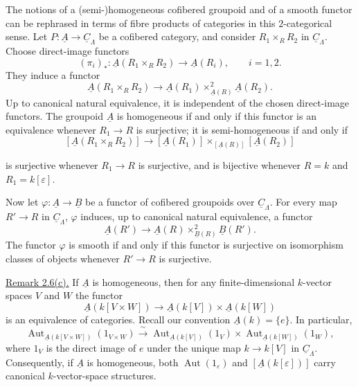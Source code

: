 The notions of a (semi-)homogeneous cofibered groupoid and of a
smooth functor can be rephrased in terms of fibre products of
categories in this $2$-categorical sense. Let
$P:\underline A\longrightarrow\underline C_\Lambda$ be a
cofibered category, and consider $R_1\times_RR_2$ in
$\underline C_\Lambda$. Choose direct-image functors
\[
 (\pi_i)_*:\underline A(R_1\times_RR_2)
 \longrightarrow\underline A(R_i),\qquad i=1,2.
\]
They induce a functor
\[
 \underline A(R_1\times_RR_2)\longrightarrow
 \underline A(R_1)\times^2_{\underline A(R)}\underline A(R_2).
\]
Up to canonical natural equivalence, it is independent of the
chosen direct-image functors. The groupoid $\underline A$ is
homogeneous if and only if this functor is an equivalence whenever
$R_1\longrightarrow R$ is surjective; it is semi-homogeneous if and
only if
\[
 [\underline A(R_1\times_RR_2)]\longrightarrow
 [\underline A(R_1)]
 \times_{[\underline A(R)]}[\underline A(R_2)]
\]


is surjective whenever $R_1\longrightarrow R$ is surjective, and is
bijective whenever $R=k$ and $R_1=k[\varepsilon]$.

Now let $\varphi:\underline A\longrightarrow\underline B$ be a
functor of cofibered groupoids over $\underline C_\Lambda$. For
every map $R'\longrightarrow R$ in $\underline C_\Lambda$,
$\varphi$ induces, up to canonical natural equivalence, a functor
\[
 \underline A(R')\longrightarrow
 \underline A(R)\times^2_{\underline B(R)}\underline B(R').
\]
The functor $\varphi$ is smooth if and only if this functor is
surjective on isomorphism classes of objects whenever
$R'\longrightarrow R$ is surjective.

\underline{Remark 2.6(c).} If $\underline A$ is homogeneous, then
for any finite-dimensional $k$-vector spaces $V$ and $W$ the functor
\[
 \underline A(k[V\times W])\longrightarrow
 \underline A(k[V])\times\underline A(k[W])
\]
is an equivalence of categories. Recall our convention
$\underline A(k)=\{e\}$. In particular,
\[
 \operatorname{Aut}_{\underline A(k[V\times W])}(1_{V\times W})
 \xrightarrow{\ \sim\ }
 \operatorname{Aut}_{\underline A(k[V])}(1_V)
 \times
 \operatorname{Aut}_{\underline A(k[W])}(1_W),
\]
where $1_V$ is the direct image of $e$ under the unique map
$k\longrightarrow k[V]$ in $\underline C_\Lambda$. Consequently,
if $\underline A$ is homogeneous, both
$\operatorname{Aut}(1_\varepsilon)$ and
$[\underline A(k[\varepsilon])]$ carry canonical $k$-vector-space
structures.

